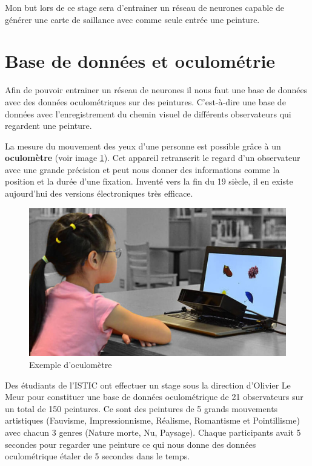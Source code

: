 \par
Mon but lors de ce stage sera d'entrainer un réseau de neurones capable de générer une carte de saillance avec comme seule entrée une peinture. 

\section{Base de données et oculométrie}
\par
Afin de pouvoir entrainer un réseau de neurones il nous faut une base de données avec des données oculométriques sur des peintures. C'est-à-dire une base de données avec l'enregistrement du chemin visuel de différents observateurs qui regardent une peinture.

\par
La mesure du mouvement des yeux d'une personne est possible grâce à un \textbf{oculomètre} (voir image \ref{oculo}). Cet appareil retranscrit le regard d'un observateur avec une grande précision et peut nous donner des informations comme la position et la durée d'une fixation. Inventé vers la fin du 19 siècle, il en existe aujourd'hui des versions électroniques très efficace.

\begin{figure}[!ht]
    \centering
    \includegraphics[width=0.7\linewidth]{datas/oculometre.jpg}
    \caption{Exemple d'oculomètre}
    \label{oculo}
\end{figure}

Des étudiants de l'ISTIC ont effectuer un stage sous la direction d'Olivier Le Meur pour constituer une base de données oculométrique de 21 observateurs sur un total de 150 peintures. Ce sont des peintures de 5 grands mouvements artistiques (Fauvisme, Impressionnisme, Réalisme, Romantisme et Pointillisme) avec chacun 3 genres (Nature morte, Nu, Paysage). Chaque participants avait 5 secondes pour regarder une peinture ce qui nous donne des données oculométrique étaler de 5 secondes dans le temps.